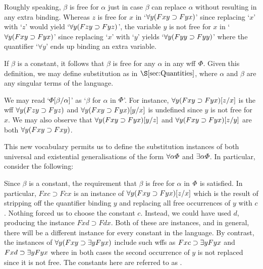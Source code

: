 
Roughly speaking, $\beta$ is free for $\alpha$ just in case $\beta$ can replace $\alpha$ without resulting in any extra binding.
Whereas $z$ is free for $x$ in `$\forall y(Fxy \supset Fyx)$' since replacing `$x$' with `$z$' would yield `$\forall y(Fzy \supset Fyz)$', the variable $y$ is not free for $x$ in `$\forall y(Fxy \supset Fyx)$' since replacing `$x$' with `$y$' yields `$\forall y(Fyy \supset Fyy)$' where the quantifier `$\forall y$' ends up binding an extra variable.

If $\beta$ is a constant, it follows that $\beta$ is free for any $\alpha$ in any wff $\varPhi$. 
Given this definition, we may define substitution as in $\S\ref{sec:Quantities}$, where $\alpha$ and $\beta$ are any singular terms of the language.


We may read `$\varPhi[\beta/\alpha]$' as `$\beta$ for $\alpha$ in $\varPhi$'.
For instance, $\forall y(Fxy \supset Fyx)[z/x]$ is the wff $\forall y(Fzy \supset Fyz)$ and $\forall y(Fxy \supset Fyx)[y/x]$ is undefined since $y$ is not free for $x$.
We may also observe that $\forall y(Fxy \supset Fyx)[y/z]$ and $\forall y(Fxy \supset Fyx)[z/y]$ are both $\forall y(Fxy \supset Fxy)$.

This new vocabulary permits us to define the substitution instances of both universal and existential generalisations of the form $\forall \alpha\varPhi$ and $\exists \alpha\varPhi$.
In particular, consider the following:


Since $\beta$ is a constant, the requirement that $\beta$ is free for $\alpha$ in $\varPhi$ is satisfied.
In particular, $Fxc \supset Fcx$ is an instance of $\forall y(Fxy \supset Fyx)[z/x]$ which is the result of stripping off the quantifier binding $y$ and replacing all free occurrences of $y$ with $c$. 
Nothing forced us to choose the constant $c$.
Instead, we could have used $d$, producing the instance $Fxd \supset Fdx$.
Both of these are instances, and in general, there will be a different instance for every constant in the language.
By contrast, the instances of $\forall y(Fxy \supset \exists yFyx)$ include such wffs as $Fxc \supset \exists yFyx$ and $Fxd \supset \exists yFyx$ where in both cases the second occurrence of $y$ is not replaced since it is not free. 
The constants here are referred to as .




